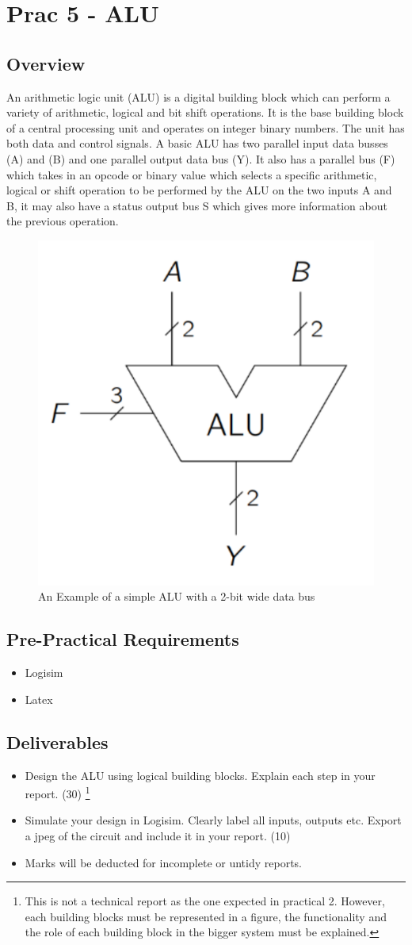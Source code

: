 \newpage
\section{Prac 5 - ALU}
\label{sec:Prac5}
\subsection{Overview}
An arithmetic logic unit (ALU) is a digital building block which can perform a variety of arithmetic, logical and bit shift operations. It is the base building block of a central processing unit and operates on integer binary numbers. The unit has both data and control signals. A basic ALU has two parallel input data busses (A) and (B) and one parallel output data bus (Y). It also has a parallel bus (F) which takes in an opcode or binary value which selects a specific arithmetic, logical or shift operation to be performed by the ALU on the two inputs A and B, it may also have a status output bus S which gives more information about the previous operation.
\begin{figure}[H]
\centering
\includegraphics[width=0.35\columnwidth]{Figures/ALU}
\caption{An Example of a simple ALU with a 2-bit wide data bus}
\label{fig:ALU}
\end{figure}

\subsection{Pre-Practical Requirements}
\begin{itemize}
    \item Logisim
    \item Latex
\end{itemize}

\subsection{Deliverables}
\begin{itemize}
    \item Design the ALU using logical building blocks. Explain each step in your report. (30) \footnote{This is not a technical report as the one expected in practical 2. However, each building blocks must be represented in a figure, the functionality and the role of each building block in the bigger system must be explained.}
    \item Simulate your design in Logisim. Clearly label all inputs, outputs etc. Export a jpeg of the circuit and include it in your report. (10)
    \item Marks will be deducted for incomplete or untidy reports.
\end{itemize}


